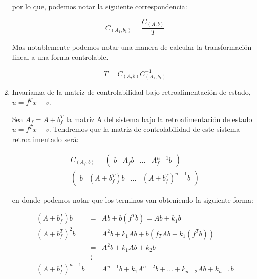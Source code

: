 \begin{enumerate}
                por lo que, podemos notar la siguiente correspondencia:

                \begin{equation*}
                    C_{(A_1, b_1)} = \frac{C_{(A, b)}}{T} 
                \end{equation*}

                Mas notablemente podemos notar una manera de calcular la transformación lineal a una forma controlable.

                \begin{equation}
                    T = C_{(A, b)} C_{(A_1, b_1)}^{-1}
                \end{equation}

            \item Invarianza de la matriz de controlabilidad bajo retroalimentación de estado, $u = f^T x + v$.

                Sea $A_f = A + b_f^T$ la matriz A del sistema bajo la retroalimentación de estado $u = f^T x + v$. Tendremos que la matriz de controlabilidad de este sistema retroalimentado será:

                \begin{multline*}
                C_{(A_f, b)} =
                \begin{pmatrix}
                b & A_f b & \dots & A_f^{n-1} b
                \end{pmatrix} = \\
                \begin{pmatrix}
                b & \left( A + b_f^T \right) b & \dots & \left( A + b_f^T \right)^{n-1} b
                \end{pmatrix}
                \end{multline*}

                en donde podemos notar que los terminos van obteniendo la siguiente forma:

                \begin{eqnarray*}
                    \left( A + b_f^T \right) b & = & A b + b (f^T b) = A b + k_1 b\\
                    \left( A + b_f^T \right)^{2} b & = & A^2 b + k_1 A b + b (f_T A b + k_1 (f^T b)) \\
                    & = & A^2 b + k_1 A b + k_2 b \\
                    & \vdots & \\
                    \left( A + b_f^T \right)^{n-1} b & = & A^{n-1} b + k_1 A^{n-2} b + \dots + k_{n-2} A b + k_{n-1} b
                \end{eqnarray*}


\end{enumerate}
